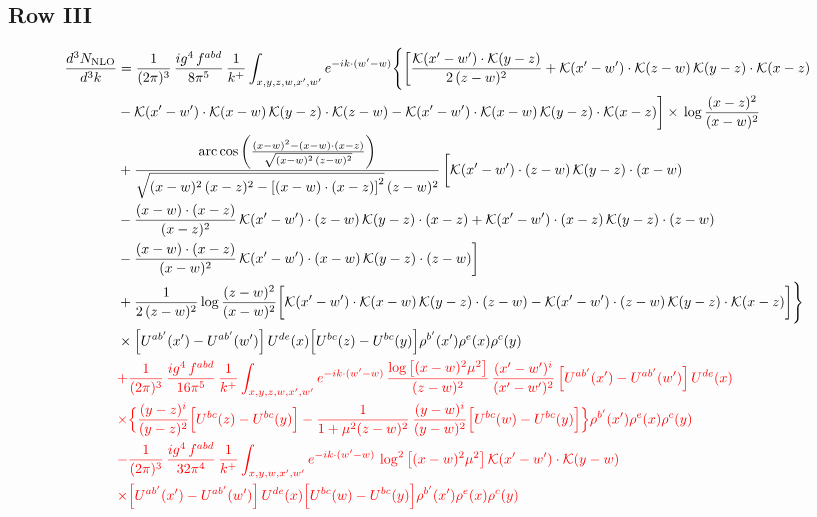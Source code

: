 \documentclass[9pt]{article}
\numberwithin{equation}{section}
\begin{document}
\subsection{Row III}
\begin{align}
\frac{d^{3}N_{\rm NLO}}{d^{3}k} &=\frac{1}{(2\pi)^{3}}\,\frac{ig^{4}\,f^{abd}}{8\pi^{5}}\,\frac{1}{k^{+}}\int_{x,y,z,w,x',w'}e^{-ik\cdot(w'-w)}\Bigg\{\bigg[\frac{\mathcal{K}(x'-w')\cdot\mathcal{K}(y-z)}{2\,(z-w)^{2}}+\mathcal{K}(x'-w')\cdot\mathcal{K}(z-w)\,\mathcal{K}(y-z)\cdot\mathcal{K}(x-z)\notag \\
&-\mathcal{K}(x'-w')\cdot\mathcal{K}(x-w)\,\mathcal{K}(y-z)\cdot\mathcal{K}(z-w)-\mathcal{K}(x'-w')\cdot\mathcal{K}(x-w)\,\mathcal{K}(y-z)\cdot\mathcal{K}(x-z)\bigg]\times\, \log\frac{(x-z)^{2}}{(x-w)^{2}}\notag \\
&+\frac{\mathrm{arc\,cos}\left(\frac{(x-w)^{2}-(x-w)\cdot (x-z)}{\sqrt{(x-w)^{2}\,(z-w)^{2}}}\right)}{\sqrt{(x-w)^{2}\,(x-z)^{2}-\left[(x-w)\cdot (x-z)\right]^{2}}\,(z-w)^{2}}\,\bigg[\mathcal{K}(x'-w')\cdot(z-w)\,\mathcal{K}(y-z)\cdot(x-w)\notag \\ & -\frac{(x-w)\cdot(x-z)}{(x-z)^{2}}\,\mathcal{K}(x'-w')\cdot(z-w)\,\mathcal{K}(y-z)\cdot(x-z)+\mathcal{K}(x'-w')\cdot(x-z)\,\mathcal{K}(y-z)\cdot(z-w)\notag \\ & -\frac{(x-w)\cdot(x-z)}{(x-w)^{2}}\,\mathcal{K}(x'-w')\cdot(x-w)\,\mathcal{K}(y-z)\cdot(z-w)\bigg]\notag \\
&+\frac{1}{2\,(z-w)^{2}}\log\frac{(z-w)^{2}}{(x-w)^{2}}\bigg[\mathcal{K}(x'-w')\cdot\mathcal{K}(x-w)\,\mathcal{K}(y-z)\cdot(z-w)-\mathcal{K}(x'-w')\cdot(z-w)\,\mathcal{K}(y-z)\cdot\mathcal{K}(x-z)\bigg]\Bigg\}\notag\\
&\times\Big[U^{ab'}(x')-U^{ab'}(w')\Big]\,U^{de}(x)\Big[U^{bc}(z)-U^{bc}(y)\Big]\rho^{b'}(x')\rho^{e}(x)\rho^{c}(y)\notag\\
&{\color{red}+\frac{1}{(2\pi)^{3}}\,\frac{ig^{4}\,f^{abd}}{16\pi^{5}}\,\frac{1}{k^{+}}\int_{x,y,z,w,x',w'}e^{-ik\cdot(w'-w)}\,\frac{\log\big[(x-w)^{2}\mu^{2}\big]}{(z-w)^{2}}\,\frac{(x'-w')^{i}}{(x'-w')^{2}}\,\Big[U^{ab'}(x')-U^{ab'}(w')\Big]\,U^{de}(x)}\notag\\
&{\color{red}\times\Big\{\frac{(y-z)^{i}}{(y-z)^{2}}\Big[U^{bc}(z)-U^{bc}(y)\Big]-\frac{1}{1+\mu^{2}(z-w)^{2}}\,\frac{(y-w)^{i}}{(y-w)^{2}}\Big[U^{bc}(w)-U^{bc}(y)\Big]\Big\}\rho^{b'}(x')\rho^{e}(x)\rho^{c}(y)}\notag \\
&{\color{red}-\frac{1}{(2\pi)^{3}}\,\frac{ig^{4}\,f^{abd}}{32\pi^{4}}\,\frac{1}{k^{+}}\int_{x,y,w,x',w'}e^{-ik\cdot(w'-w)}\,\log^{2}\big[(x-w)^{2}\mu^{2}\big]\,\mathcal{K}(x'-w')\cdot\mathcal{K}(y-w)}\notag\\
&{\color{red}\times\Big[U^{ab'}(x')-U^{ab'}(w')\Big]\,U^{de}(x)\Big[U^{bc}(w)-U^{bc}(y)\Big]\rho^{b'}(x')\rho^{e}(x)\rho^{c}(y)}
\end{align}
\end{document}
